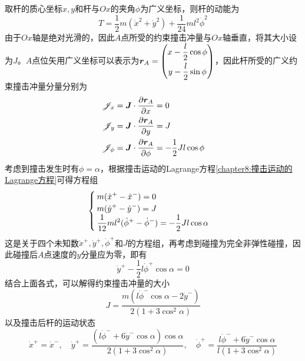 \begin{solution}
取杆的质心坐标$x,y$和杆与$Ox$的夹角$\phi$为广义坐标，则杆的动能为
\begin{equation*}
	T = \frac12m(\dot{x}^2+\dot{y}^2) + \frac{1}{24}ml^2\dot{\phi}^2
\end{equation*}
由于$Ox$轴是绝对光滑的，因此$A$点所受的约束撞击冲量与$Ox$轴垂直，将其大小设为$J$。$A$点位矢用广义坐标可以表示为$\boldsymbol{r}_A = \begin{pmatrix} x-\dfrac l2\cos\phi \\[1.5ex] y-\dfrac l2\sin\phi \end{pmatrix}$，因此杆所受的广义约束撞击冲量分量分别为
\begin{align*}
	\mathscr{J}_x & = \boldsymbol{J}\cdot \frac{\partial \boldsymbol{r}_A}{\partial x} = 0 \\
	\mathscr{J}_y & = \boldsymbol{J}\cdot \frac{\partial \boldsymbol{r}_A}{\partial y} = J \\
	\mathscr{J}_\phi & = \boldsymbol{J}\cdot \frac{\partial \boldsymbol{r}_A}{\partial \phi} = -\frac12 Jl\cos\phi
\end{align*}
考虑到撞击发生时有$\phi=\alpha$，根据撞击运动的Lagrange方程\eqref{chapter8:撞击运动的Lagrange方程}可得方程组
\begin{equation*}
\begin{cases}
	\displaystyle m(\dot{x}^+-\dot{x}^-) = 0 \\
	\displaystyle m(\dot{y}^+-\dot{y}^-) = J \\
	\displaystyle \frac{1}{12}ml^2(\dot{\phi}^+-\dot{\phi}^-) = -\frac12 Jl\cos\alpha
\end{cases}
\end{equation*}
这是关于四个未知数$\dot{x}^+,\dot{y}^+,\dot{\phi}^+$和$J$的方程组，再考虑到碰撞为完全非弹性碰撞，因此碰撞后$A$点速度的$y$分量应为零，即有
\begin{equation*}
	\dot{y}^+ - \frac12 l\dot{\phi}^+\cos\alpha = 0
\end{equation*}
结合上面各式，可以解得约束撞击冲量的大小
\begin{equation*}
	J = \frac{m(l\dot{\phi}^-\cos\alpha-2\dot{y}^-)}{2(1+3\cos^2\alpha)}
\end{equation*}
以及撞击后杆的运动状态
\begin{equation*}
	\dot{x}^+ = \dot{x}^-,\quad \dot{y}^+ = \frac{(l\dot{\phi}^-+6\dot{y}^-\cos\alpha)\cos\alpha}{2(1+3\cos^2\alpha)},\quad \dot{\phi}^+ = \frac{l\dot{\phi}^-+6\dot{y}^-\cos\alpha}{l(1+3\cos^2\alpha)}
\end{equation*}
\end{solution}
